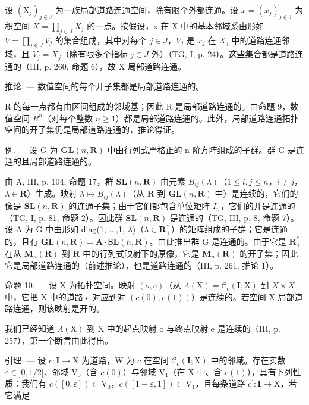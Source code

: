 设 \((\mathrm{X}_{j})_{j\in\mathrm{J}}\) 为一族局部道路连通空间，除有限个外都连通。设 \(x=(x_{j})_{j\in\mathrm{J}}\) 为积空间 \(X=\prod_{j\in J}X_{j}\) 的一点。按假设，x 在 X 中的基本邻域系由形如 \(V=\prod_{j\in J}V_{j}\) 的集合组成，其中对每个 \(j\in J\)，\(V_{j}\) 是 \(x_{j}\) 在 \(X_{j}\) 中的道路连通邻域，且 \(V_{j}=X_{j}\)（除有限多个指标 \(j\in J\) 外）（TG, I, p. 24）。这些集合都是道路连通的（III, p. 260, 命题 6），故 X 局部道路连通。

推论. --- 数值空间的每个开子集都是局部道路连通的。

R 的每一点都有由区间组成的邻域基；因此 R 是局部道路连通的。由命题 9，数值空间 \(R^{n}\)（对每个整数 \(n \geqslant 1\)）都是局部道路连通的。此外，局部道路连通拓扑空间的开子集仍是局部道路连通的，推论得证。

例. --- 设 G 为 \(\mathbf{GL}(n,\mathbf{R})\) 中由行列式严格正的 n 阶方阵组成的子群。群 G 是连通的且局部道路连通的。

由 A, III, p. 104, 命题 17，群 \(\mathbf{SL}(n,\mathbf{R})\) 由元素 \(B_{ij}(\lambda)\)（\(1\leqslant i,j\leqslant n\)，\(i\neq j\)，\(\lambda\in\mathbf{R}\)）生成。映射 \(\lambda\mapsto B_{ij}(\lambda)\)（从 \(\mathbf{R}\) 到 \(\mathbf{GL}(n,\mathbf{R})\) 中）是连续的，它们的像是 \(\mathbf{SL}(n,\mathbf{R})\) 的连通子集；由于它们都包含单位矩阵 \(I_n\)，它们的并是连通的（TG, I, p. 81, 命题 2）。因此群 \(\mathbf{SL}(n,\mathbf{R})\) 是连通的（TG, III, p. 8, 命题 7）。设 A 为 G 中由形如 diag(1, \(\ldots\),1, \(\lambda\))（\(\lambda\in\mathbf{R}_{+}^{*}\)）的矩阵组成的子群；它是连通的，且有 \(\mathbf{GL}(n,\mathbf{R})=\mathbf{A}\cdot\mathbf{SL}(n,\mathbf{R})\)。由此推出群 G 是连通的。由于它是 \(\mathbf{R}_{+}^{*}\) 在从 \(\mathbf{M}_{n}(\mathbf{R})\) 到 \(\mathbf{R}\) 中的行列式映射下的原像，它是 \(\mathbf{M}_{n}(\mathbf{R})\) 的开子集；因此它是局部道路连通的（前述推论），也是道路连通的（III, p. 261, 推论 1）。

命题 10. --- 设 X 为拓扑空间。映射 \((o, e)\)（从 \(\Lambda(\mathrm{X}) = \mathcal{C}_{c}(\mathbf{I}; \mathrm{X})\) 到 \(X \times X\) 中，它把 X 中的道路 c 对应到对 \((c(0), c(1))\)）是连续的。若空间 X 局部道路连通，则该映射是开的。

我们已经知道 \(\Lambda(\mathrm{X})\) 到 X 中的起点映射 o 与终点映射 e 是连续的（III, p. 257），第一个断言由此得出。

引理. --- 设 \(c\colon \mathbf{I}\to \mathrm{X}\) 为道路，W 为 \(c\) 在空间 \(\mathcal{C}_c(\mathbf{I};\mathrm{X})\) 中的邻域。存在实数 \(\varepsilon \in ]0,1 / 2]\)、邻域 \(\mathrm{V}_0\)（含 \(c(0)\)）与邻域 \(\mathrm{V}_1\)（在 X 中、含 \(c(1)\)），具有下列性质：我们有 \(c([0,\varepsilon])\subset \mathrm{V}_0\)，\(c([1 - \varepsilon,1])\subset \mathrm{V}_1\)，且每条道路 \(c^{\prime}\colon \mathbf{I}\rightarrow \mathrm{X}\)，若它满足

